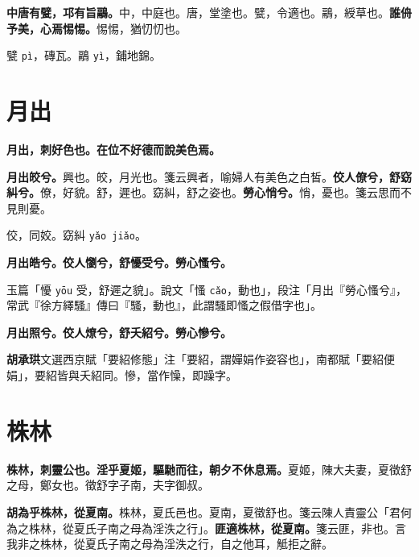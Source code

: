 \textbf{中唐有甓，邛有旨鷊。}{\footnotesize 中，中庭也。唐，堂塗也。甓，令適也。鷊，綬草也。}\textbf{誰侜予美，心焉惕惕。}{\footnotesize 惕惕，猶忉忉也。}

\begin{quoting}甓 \texttt{pì}，磚瓦。鷊 \texttt{yì}，鋪地錦。\end{quoting}

\section{月出}


\textbf{月出，刺好色也。在位不好德而說美色焉。}

\textbf{月出皎兮。}{\footnotesize 興也。皎，月光也。箋云興者，喻婦人有美色之白皙。}\textbf{佼人僚兮，舒窈糾兮。}{\footnotesize 僚，好貌。舒，遲也。窈糾，舒之姿也。}\textbf{勞心悄兮。}{\footnotesize 悄，憂也。箋云思而不見則憂。}

\begin{quoting}佼，同姣。窈糾 \texttt{yǎo jiǎo}。\end{quoting}

\textbf{月出皓兮。佼人懰兮，舒懮受兮。勞心慅兮。}

\begin{quoting}玉篇「懮 \texttt{yōu} 受，舒遲之貌」。說文「慅 \texttt{cǎo}，動也」，段注「月出『勞心慅兮』，常武『徐方繹騷』傳曰『騷，動也』，此謂騷即慅之假借字也」。\end{quoting}

\textbf{月出照兮。佼人燎兮，舒夭紹兮。勞心慘兮。}

\begin{quoting}\textbf{胡承珙}文選西京賦「要紹修態」注「要紹，謂嬋娟作姿容也」，南都賦「要紹便娟」，要紹皆與夭紹同。慘，當作懆，即躁字。\end{quoting}

\section{株林}


\textbf{株林，刺靈公也。淫乎夏姬，驅馳而往，朝夕不休息焉。}{\footnotesize 夏姬，陳大夫妻，夏徵舒之母，鄭女也。徵舒字子南，夫字御叔。}

\textbf{胡為乎株林，從夏南。}{\footnotesize 株林，夏氏邑也。夏南，夏徵舒也。箋云陳人責靈公「君何為之株林，從夏氏子南之母為淫泆之行」。}\textbf{匪適株林，從夏南。}{\footnotesize 箋云匪，非也。言我非之株林，從夏氏子南之母為淫泆之行，自之他耳，觝拒之辭。}


